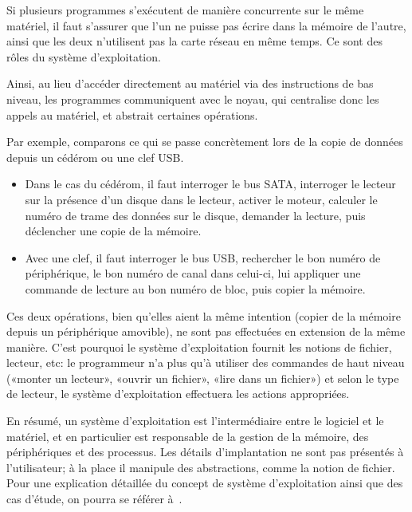 Si plusieurs programmes s'exécutent de manière concurrente sur le même matériel,
il faut s'assurer que l'un ne puisse pas écrire dans la mémoire de l'autre,
ainsi que les deux n'utilisent pas la carte réseau en même temps. Ce sont des
rôles du système d'exploitation.

Ainsi, au lieu d'accéder directement au matériel via des instructions de bas
niveau, les programmes communiquent avec le noyau, qui centralise donc les
appels au matériel, et abstrait certaines opérations.

Par exemple, comparons ce qui se passe concrètement lors de la copie de données
depuis un cédérom ou une clef USB.\@

\begin{itemize}

  \item Dans le cas du cédérom, il faut interroger le bus SATA, interroger le
    lecteur sur la présence d'un disque dans le lecteur, activer le moteur,
    calculer le numéro de trame des données sur le disque, demander la lecture,
    puis déclencher une copie de la mémoire.

  \item Avec une clef, il faut interroger le bus USB, rechercher le bon numéro
    de périphérique, le bon numéro de canal dans celui-ci, lui appliquer une
    commande de lecture au bon numéro de bloc, puis copier la mémoire.

\end{itemize}

Ces deux opérations, bien qu'elles aient la même intention (copier de la mémoire
depuis un périphérique amovible), ne sont pas effectuées en extension de la même
manière. C'est pourquoi le système d'exploitation fournit les notions de
fichier, lecteur, etc: le programmeur n'a plus qu'à utiliser des commandes de
haut niveau («monter un lecteur», «ouvrir un fichier», «lire dans un
fichier») et selon le type de lecteur, le système d'exploitation effectuera les
actions appropriées.

En résumé, un système d'exploitation est l'intermédiaire entre le logiciel et le
matériel, et en particulier est responsable de la gestion de la mémoire, des
périphériques et des processus. Les détails d'implantation ne sont pas présentés
à l'utilisateur; à la place il manipule des abstractions, comme la notion de
fichier. Pour une explication détaillée du concept de système d'exploitation
ainsi que des cas d'étude, on pourra se référer à~\cite{tanenbaum}.

